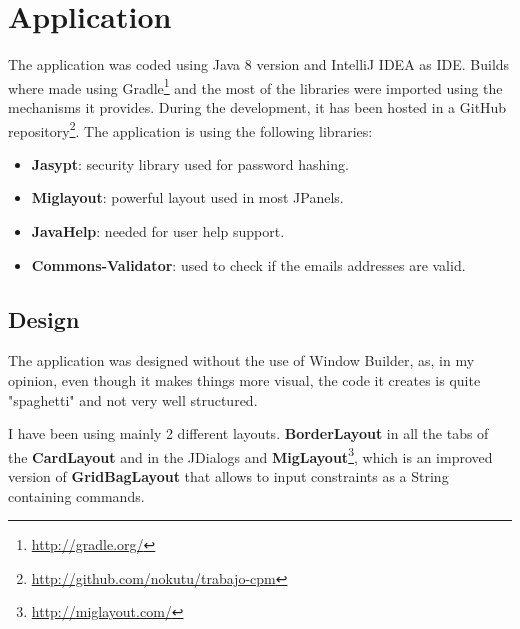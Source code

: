 \documentclass[11pt]{article}
\begin{document}
   \section{Application}
   The application was coded using Java 8 version and IntelliJ IDEA as IDE. Builds where made using Gradle\footnote{\url{http://gradle.org/}} and the most of the libraries were imported using the mechanisms it provides. During the development, it has been hosted in a GitHub repository\footnote{\url{http://github.com/nokutu/trabajo-cpm}}. The application is using the following libraries:
   \begin{itemize}
	   	\item \textbf{Jasypt}: security library used for password hashing.
	   	\item \textbf{Miglayout}: powerful layout used in most JPanels.
	   	\item \textbf{JavaHelp}: needed for user help support.
	   	\item \textbf{Commons-Validator}: used to check if the emails addresses are valid.
   \end{itemize}
   \subsection{Design}
   The application was designed without the use of Window Builder, as, in my opinion, even though it makes things more visual, the code it creates is quite "spaghetti" and not very well structured.
   
   I have been using mainly 2 different layouts. \textbf{BorderLayout} in all the tabs of the \textbf{CardLayout} and in the JDialogs and \textbf{MigLayout}\footnote{\url{http://miglayout.com/}}, which is an improved  version of \textbf{GridBagLayout} that allows to input constraints as a String containing commands.
   
\end{document}
